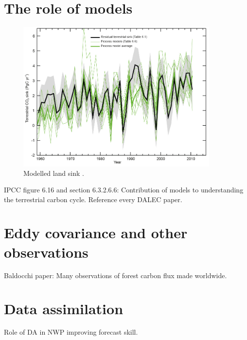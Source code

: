 \documentclass[11pt]{article}
\begin{document}
\section{The role of models}

\begin{figure}[ht]
    \centering
    \includegraphics[width=0.9\textwidth]{ipcc_fig6_16.jpg}
    \caption{Modelled land sink \citep{ciais2014carbon}.}
    \label{fig:ipcc_fig6.1}
\end{figure}

IPCC figure 6.16 and section 6.3.2.6.6: Contribution of models to understanding the terrestrial carbon cycle. Reference every DALEC paper.

\section{Eddy covariance and other observations}

Baldocchi paper: Many observations of forest carbon flux made worldwide.

\section{Data assimilation}

Role of DA in NWP improving forecast skill. 


{}
\end{document}

